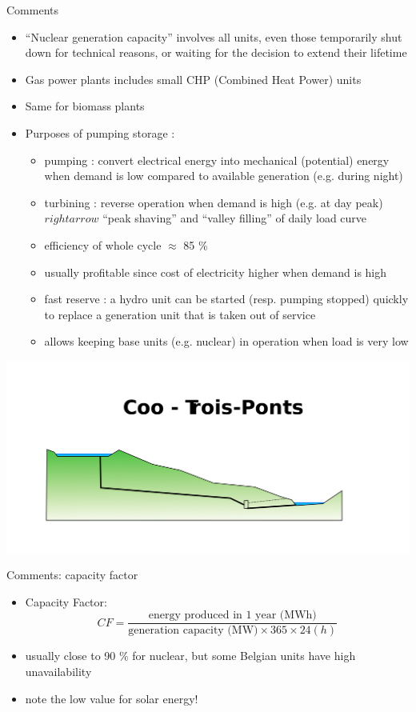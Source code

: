 \begin{frame}[allowframebreaks]{Comments}
\begin{itemize}
\item “Nuclear generation capacity” involves all units, even those temporarily shut down for technical reasons, or waiting for the decision to extend their lifetime
\item Gas power plants includes small CHP (Combined Heat Power) units
\item Same for biomass plants
\item Purposes of pumping storage :
\begin{itemize}
\item pumping : convert electrical energy into mechanical (potential) energy when demand is low compared to available generation (e.g. during night)
\item turbining : reverse operation when demand is high (e.g. at day peak) $rightarrow$ “peak shaving” and “valley filling” of daily load curve
\item efficiency of whole cycle $\approx$ 85 \%
\item usually profitable since cost of electricity higher when demand is high
\item fast reserve : a hydro unit can be started (resp. pumping stopped) quickly to replace a generation unit that is taken out of service
\item allows keeping base units (e.g. nuclear) in operation when load is very low
\end{itemize}
\end{itemize}
\begin{center}
\includegraphics[width=0.4\linewidth]{images/Coo-Trois-Ponts.svg.png}
\end{center}
\end{frame}

\begin{frame}{Comments: capacity factor}
\begin{itemize}
\item Capacity Factor: 
$$CF = \frac{\text{energy produced in 1 year (MWh)}}{\text{generation capacity (MW)} \times 365 \times 24(h)}$$

\item usually close to 90 \% for nuclear, but some Belgian units have high unavailability
\item note the low value for solar energy!
\end{itemize}
\end{frame}


